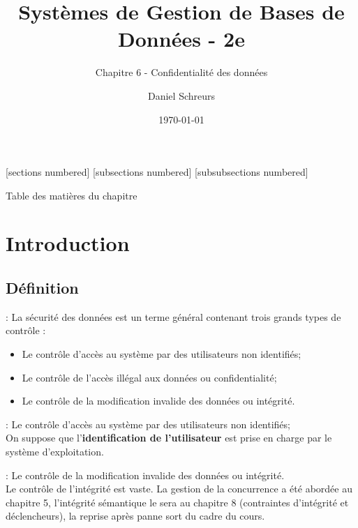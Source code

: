 \documentclass[10pt]{beamer}
\title{Systèmes de Gestion de Bases de Données - 2e}
\subtitle{Chapitre 6 - Confidentialité des données}
\date{\today}
\author{Daniel Schreurs}
\institute{Haute École de Province de Liège}
\begin{document}
\maketitle

[sections numbered]
[subsections numbered]
[subsubsections numbered]
\begin{frame}[allowframebreaks]{Table des matières du chapitre}
    \tableofcontents[subsectionstyle=show/show/hide,subsubsectionstyle=show/show/hide,]
\end{frame}

\section{Introduction}
\tocss
\subsection{Définition}
\begin{frame}{\secname : \subsecname}
    La sécurité des données est un terme général contenant trois grands types de contrôle :
    \begin{itemize}
        \item Le contrôle d'accès au système par des utilisateurs non identifiés;
        \item Le contrôle de l'accès illégal aux données ou confidentialité;
        \item Le contrôle de la modification invalide des données ou intégrité.
    \end{itemize}
\end{frame}

\begin{frame}{\secname : \subsecname}
    Le contrôle d'accès au système par des utilisateurs non identifiés;\\
    On suppose que l'\textbf{identification de l'utilisateur} est prise en charge par le système d'exploitation.
\end{frame}

\begin{frame}{\secname : \subsecname}
    Le contrôle de la modification invalide des données ou intégrité.\\
    Le contrôle de l'intégrité est vaste. La gestion de la concurrence a été abordée au chapitre 5, l'intégrité sémantique le sera au chapitre 8 (contraintes d'intégrité et déclencheurs), la reprise après panne sort du cadre du cours.
\end{frame}
\end{document}
